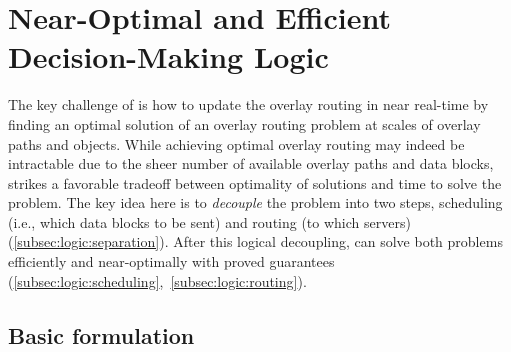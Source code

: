 \section{Near-Optimal and Efficient Decision-Making Logic}
\label{sec:logic}

The key challenge of \name is how to update the overlay routing 
in near real-time by finding an optimal solution of an overlay 
routing problem at scales of 
\fillme overlay paths and \fillme objects.
While achieving optimal overlay routing may 
indeed be intractable due to the
sheer number of available overlay paths and data blocks,
\name strikes a favorable tradeoff between optimality of solutions
and time to solve the problem. 
The key idea here is to {\em decouple} the problem into two steps,
scheduling (i.e., which data blocks to be sent)
and routing (to which servers)
 (\Section\ref{subsec:logic:separation}). 
After this logical decoupling, \name can solve both problems 
efficiently and near-optimally with proved guarantees
(\Section\ref{subsec:logic:scheduling},~\ref{subsec:logic:routing}).



\subsection{Basic formulation}
\label{subsec:logic:formulation}

